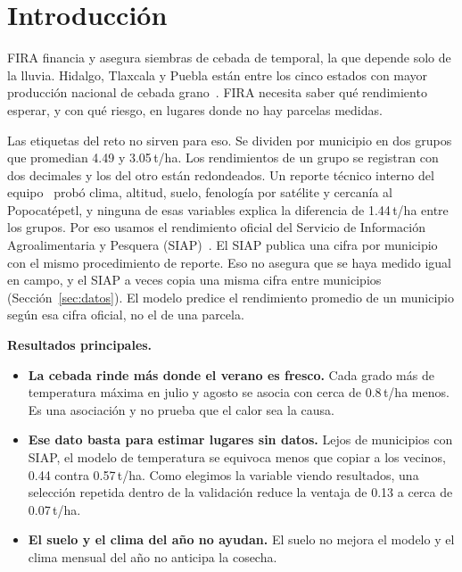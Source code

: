 \section{Introducción}\label{sec:intro}

FIRA financia y asegura siembras de cebada de temporal, la que depende solo de la lluvia. Hidalgo, Tlaxcala y Puebla
están entre los cinco estados con mayor producción nacional de cebada grano~\cite{sader2025}. FIRA necesita saber qué
rendimiento esperar, y con qué riesgo, en lugares donde no hay parcelas medidas.

Las etiquetas del reto no sirven para eso. Se dividen por municipio en dos grupos que promedian 4.49 y 3.05\,t/ha.
Los rendimientos de un grupo se registran con dos decimales y los del otro están redondeados. Un reporte técnico
interno del equipo~\cite{regimenes} probó clima, altitud, suelo, fenología por satélite y cercanía al Popocatépetl,
y ninguna de esas variables explica la diferencia de 1.44\,t/ha entre los grupos. Por eso usamos el rendimiento
oficial del Servicio de Información Agroalimentaria y Pesquera (SIAP)~\cite{siap}. El SIAP publica una cifra por
municipio con el mismo procedimiento de reporte. Eso no asegura que se haya medido igual en campo, y el SIAP a veces
copia una misma cifra entre municipios (Sección~\ref{sec:datos}). El modelo predice el rendimiento promedio de un
municipio según esa cifra oficial, no el de una parcela.

\textbf{Resultados principales.}
\begin{itemize}
\item \textbf{La cebada rinde más donde el verano es fresco.} Cada grado más de temperatura máxima en julio y agosto
se asocia con cerca de 0.8\,t/ha menos. Es una asociación y no prueba que el calor sea la causa.
\item \textbf{Ese dato basta para estimar lugares sin datos.} Lejos de municipios con SIAP, el modelo de temperatura
se equivoca menos que copiar a los vecinos, 0.44 contra 0.57\,t/ha. Como elegimos la variable viendo resultados, una
selección repetida dentro de la validación reduce la ventaja de 0.13 a cerca de 0.07\,t/ha.
\item \textbf{El suelo y el clima del año no ayudan.} El suelo no mejora el modelo y el clima mensual del año no
anticipa la cosecha.
\end{itemize}
